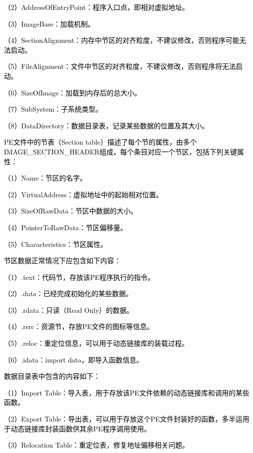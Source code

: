 \textcolor{black}{（2）AddressOfEntryPoint：程序入口点，即相对虚拟地址。}

\textcolor{black}{（3）ImageBase：加载机制。}

\textcolor{black}{（4）SectionAlignment：内存中节区的对齐粒度，不建议修改，否则程序可能无法启动。}

\textcolor{black}{（5）FileAlignment：文件中节区的对齐粒度，不建议修改，否则程序将无法启动。}

\textcolor{black}{（6）SizeOfImage：加载到内存后的总大小。}

\textcolor{black}{（7）SubSystem：子系统类型。}

\textcolor{black}{（8）DataDirectory：数据目录表，记录某些数据的位置及其大小。}

\textcolor{black}{PE文件中的节表（Section table）描述了每个节的属性，由多个IMAGE\_SECTION\_HEADER组成，每个条目对应一个节区，包括下列关键属性：}

\textcolor{black}{（1）Name：节区的名字。}

\textcolor{black}{（2）VirtualAddress：虚拟地址中的起始相对位置。}

\textcolor{black}{（3）SizeOfRawData：节区中数据的大小。}

\textcolor{black}{（4）PointerToRawData：节区偏移量。}

\textcolor{black}{（5）Characteristics：节区属性。}

\textcolor{black}{节区数据正常情况下应包含如下内容：}

\textcolor{black}{（1）.text：代码节，存放该PE程序执行的指令。}

\textcolor{black}{（2）.data：已经完成初始化的某些数据。}

\textcolor{black}{（3）.rdata：只读（Read Only）的数据。}

\textcolor{black}{（4）.rsrc：资源节，存放PE文件的图标等信息。}

\textcolor{black}{（5）.reloc：重定位信息，可以用于动态链接库的装载过程。}

\textcolor{black}{（6）.idata：import data，即导入函数信息。}

\textcolor{black}{数据目录表中包含的内容如下：}

\textcolor{black}{（1）Import Table：导入表，用于存放该PE文件依赖的动态链接库和调用的某些函数。}

\textcolor{black}{（2）Export Table：导出表，可以用于存放这个PE文件封装好的函数，多半运用于动态链接库封装函数供其余PE程序调用使用。}

\textcolor{black}{（3）Relocation Table：重定位表，修复地址偏移相关问题。}

